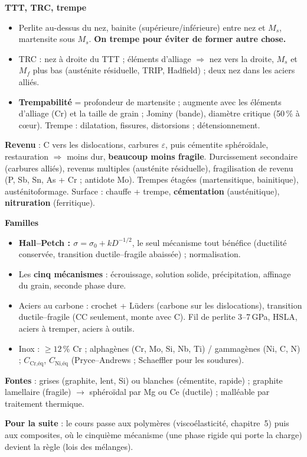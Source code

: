 \begin{recapbox}
\textbf{TTT, TRC, trempe}
\begin{itemize}
  \item Perlite au-dessus du nez, bainite (supérieure/inférieure) entre nez et $M_s$, martensite
        sous $M_s$. \textbf{On trempe pour éviter de former autre chose.}
  \item TRC : nez à droite du TTT ; éléments d'alliage $\Rightarrow$ nez vers la droite, $M_s$ et
        $M_f$ plus bas (austénite résiduelle, TRIP, Hadfield) ; deux nez dans les aciers alliés.
  \item \textbf{Trempabilité} = profondeur de martensite ; augmente avec les éléments d'alliage
        (Cr) et la taille de grain ; Jominy (bande), diamètre critique (50\,\% à c\oe ur).
        Trempe : dilatation, fissures, distorsions ; détensionnement.
\end{itemize}

\textbf{Revenu} : C vers les dislocations, carbures $\varepsilon$, puis cémentite sphéroïdale,
restauration $\Rightarrow$ moins dur, \textbf{beaucoup moins fragile}. Durcissement secondaire
(carbures alliés), revenus multiples (austénite résiduelle), fragilisation de revenu (P, Sb, Sn,
As + Cr ; antidote Mo). Trempes étagées (martensitique, bainitique), austénitoformage. Surface :
chauffe + trempe, \textbf{cémentation} (austénitique), \textbf{nitruration} (ferritique).

\textbf{Familles}
\begin{itemize}
  \item \textbf{Hall--Petch : $\sigma = \sigma_0 + kD^{-1/2}$}, le seul mécanisme tout bénéfice
        (ductilité conservée, transition ductile--fragile abaissée) ; normalisation.
  \item Les \textbf{cinq mécanismes} : écrouissage, solution solide, précipitation, affinage du
        grain, seconde phase dure.
  \item Aciers au carbone : crochet + Lüders (carbone sur les dislocations), transition
        ductile--fragile (CC seulement, monte avec C). Fil de perlite 3--7\,GPa, HSLA, aciers à
        tremper, aciers à outils.
  \item Inox : $\ge 12\,\%$ Cr ; alphagènes (Cr, Mo, Si, Nb, Ti) / gammagènes (Ni, C, N) ;
        $C_{\text{Cr,éq}}$, $C_{\text{Ni,éq}}$ (Pryce--Andrews ; Schaeffler pour les soudures).
\end{itemize}

\textbf{Fontes} : grises (graphite, lent, Si) ou blanches (cémentite, rapide) ; graphite lamellaire
(fragile) $\to$ sphéroïdal par Mg ou Ce (ductile) ; malléable par traitement thermique.

\textbf{Pour la suite} : le cours passe aux polymères (viscoélasticité, chapitre~5) puis aux
composites, où le cinquième mécanisme (une phase rigide qui porte la charge) devient la règle
(lois des mélanges).
\end{recapbox}
